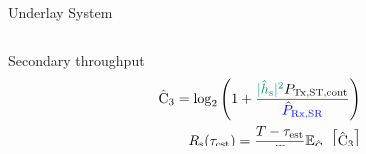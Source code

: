 \documentclass[16pt]{beamer}
\begin{document}
\begin{frame}[t]{Underlay System}
\begin{columns}
\begin{column}{0.45\columnwidth}

			{
				\begin{block}{\footnotesize Secondary throughput} %
				\vspace{-4.5mm}
				\begin{align*}
					\eca  = \log_2 \left(1 + \frac{{\color{kit-green100}{\epgs}} \preg}{{\color{blue}{\eprcvdsr}}} \right) \\
					\rs(\test) = \frac{T - \test}{T} \e{\eca} {\eca} \\[-1.7em] 
				\end{align*}
				\end{block}

}
\end{column}
\end{columns}
\end{frame}
\end{document}
